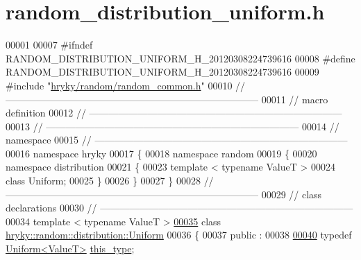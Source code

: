 \hypertarget{random__distribution__uniform_8h_source}{\section{random\-\_\-distribution\-\_\-uniform.\-h}
}

\begin{DoxyCode}
00001 
00007 \textcolor{preprocessor}{#ifndef RANDOM\_DISTRIBUTION\_UNIFORM\_H\_20120308224739616}
00008 \textcolor{preprocessor}{}\textcolor{preprocessor}{#define RANDOM\_DISTRIBUTION\_UNIFORM\_H\_20120308224739616}
00009 \textcolor{preprocessor}{}\textcolor{preprocessor}{#include "\hyperlink{random__common_8h}{hryky/random/random_common.h}"}
00010 \textcolor{comment}{//
      ------------------------------------------------------------------------------}
00011 \textcolor{comment}{// macro definition}
00012 \textcolor{comment}{//
      ------------------------------------------------------------------------------}
00013 \textcolor{comment}{//
      ------------------------------------------------------------------------------}
00014 \textcolor{comment}{// namespace}
00015 \textcolor{comment}{//
      ------------------------------------------------------------------------------}
00016 \textcolor{keyword}{namespace }hryky
00017 \{
00018 \textcolor{keyword}{namespace }random
00019 \{
00020 \textcolor{keyword}{namespace }distribution
00021 \{
00023     \textcolor{keyword}{template} < \textcolor{keyword}{typename} ValueT >
00024     \textcolor{keyword}{class }Uniform;
00025 \}
00026 \}
00027 \}
00028 \textcolor{comment}{//
      ------------------------------------------------------------------------------}
00029 \textcolor{comment}{// class declarations}
00030 \textcolor{comment}{//
      ------------------------------------------------------------------------------}
00034 \textcolor{comment}{}\textcolor{keyword}{template} < \textcolor{keyword}{typename} ValueT >
\hypertarget{random__distribution__uniform_8h_source_l00035}{}\hyperlink{classhryky_1_1random_1_1distribution_1_1_uniform}{00035} \textcolor{keyword}{class }\hyperlink{classhryky_1_1random_1_1distribution_1_1_uniform}{hryky::random::distribution::Uniform}
00036 \{
00037 \textcolor{keyword}{public} :
00038 
\hypertarget{random__distribution__uniform_8h_source_l00040}{}\hyperlink{classhryky_1_1random_1_1distribution_1_1_uniform_ae66a5ff0c431e0cef1cd4b8e96aa94d5}{00040}     \textcolor{keyword}{typedef} \hyperlink{classhryky_1_1random_1_1distribution_1_1_uniform}{Uniform<ValueT>} \hyperlink{classhryky_1_1random_1_1distribution_1_1_uniform_ae66a5ff0c431e0cef1cd4b8e96aa94d5}{this_type};

\end{DoxyCode}
